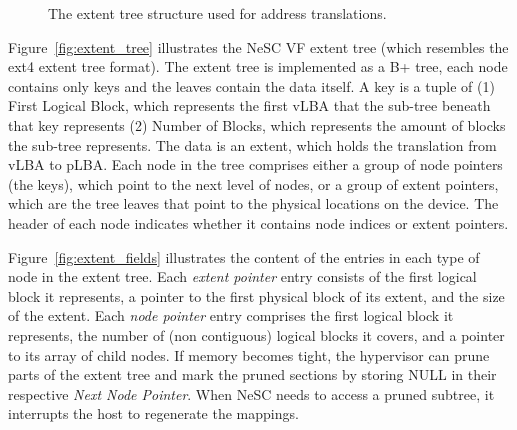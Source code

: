 \begin{figure}[t]
  \centering

      \caption{The extent tree structure used for address translations.\label{fig:extent}}

\end{figure}

Figure~\ref{fig:extent_tree} illustrates the NeSC VF extent tree (which resembles the ext4 extent tree format). The extent tree is implemented as a B+ tree, each node contains only keys and the leaves contain the data itself.
A key is a tuple of (1) First Logical Block, which represents the first vLBA that the sub-tree beneath that key represents (2) Number of Blocks, which represents the amount of blocks the sub-tree represents. The data is an extent, which holds the translation from vLBA to pLBA. 
Each node in the tree comprises either a group of node pointers (the keys), which point to the next level of nodes, or a group of extent pointers, which are the tree leaves that point to the physical locations on the device. The header of each node indicates whether it contains node indices or extent pointers.

Figure~\ref{fig:extent_fields} illustrates the content of the entries in each type of node in the extent tree. Each \emph{extent pointer} entry consists of the first logical block it represents, a pointer to the first physical block of its extent, and the size of the extent. Each \emph{node pointer} entry comprises the first logical block it represents, the number of (non contiguous) logical blocks it covers, and a pointer to its array of child nodes.
%
If memory becomes tight, the hypervisor can prune parts of the extent tree and mark the pruned sections by storing NULL in their respective \emph{Next Node Pointer}. When NeSC needs to access a pruned subtree, it interrupts the host to regenerate the mappings.

